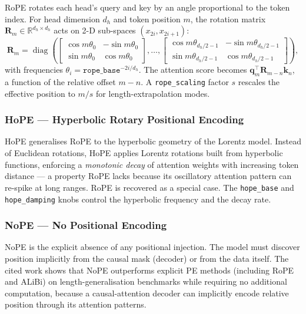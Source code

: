 RoPE \citep{su_rope_2024} rotates each head's query and key by an angle
proportional to the token index. For head dimension $d_h$ and token
position $m$, the rotation matrix $\mathbf{R}_m \in \mathbb{R}^{d_h \times d_h}$
acts on 2-D sub-spaces $(x_{2i}, x_{2i+1})$:
\[
\mathbf{R}_m = \operatorname{diag}\!\left(
\begin{bmatrix}\cos m\theta_0 & -\sin m\theta_0 \\ \sin m\theta_0 & \cos m\theta_0\end{bmatrix},
\dots,
\begin{bmatrix}\cos m\theta_{d_h/2-1} & -\sin m\theta_{d_h/2-1} \\ \sin m\theta_{d_h/2-1} & \cos m\theta_{d_h/2-1}\end{bmatrix}
\right),
\]
with frequencies $\theta_i = \texttt{rope\_base}^{-2i/d_h}$. The
attention score becomes
$\mathbf{q}_m^\top \mathbf{R}_{m-n} \mathbf{k}_n$, a function of the
relative offset $m{-}n$. A \texttt{rope\_scaling} factor $s$ rescales
the effective position to $m/s$ for length-extrapolation modes.

\subsubsection{HoPE --- Hyperbolic Rotary Positional Encoding}

HoPE \citep{dai_hope_2025} generalises RoPE to the hyperbolic geometry of
the Lorentz model. Instead of Euclidean rotations, HoPE applies
Lorentz rotations built from hyperbolic functions, enforcing a
\emph{monotonic decay} of attention weights with increasing token
distance --- a property RoPE lacks because its oscillatory attention
pattern can re-spike at long ranges. RoPE is recovered as a special
case. The \texttt{hope\_base} and \texttt{hope\_damping} knobs control
the hyperbolic frequency and the decay rate.

\subsubsection{NoPE --- No Positional Encoding}

NoPE \citep{kazemnejad_nope_2023} is the explicit absence of any
positional injection. The model must discover position implicitly from
the causal mask (decoder) or from the data itself. The cited work shows
that NoPE outperforms explicit PE methods (including RoPE and ALiBi) on
length-generalisation benchmarks while requiring no additional
computation, because a causal-attention decoder can implicitly encode
relative position through its attention patterns.

